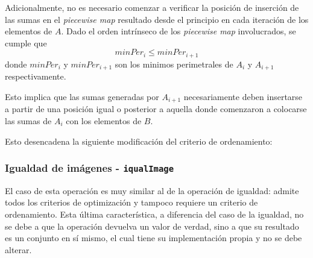 Adicionalmente, no es necesario comenzar a verificar la posición de inserción de las sumas en el \textit{piecewise map} resultado desde el principio en cada iteración de los elementos de $A$. Dado el orden intrínseco de los \textit{piecewise map} involucrados, se cumple que
\[
minPer_{i} \leq minPer_{i+1}
\]
 donde $minPer_i$ y $minPer_{i+1}$ son los minimos perimetrales de $A_i$ y $A_{i+1}$ respectivamente.
 
Esto implica que las sumas generadas por $A_{i+1}$ necesariamente deben insertarse a partir de una posición igual o posterior a aquella donde comenzaron a colocarse las sumas de $A_i$ con los elementos de $B$.

Esto desencadena la siguiente modificación del criterio de ordenamiento: 
\begin{center}
\end{center}

\subsubsection{Igualdad de imágenes - \texttt{iqualImage}}

El caso de esta operación es muy similar al de la operación de igualdad: admite todos los criterios de optimización y tampoco requiere un criterio de ordenamiento. Esta última característica, a diferencia del caso de la igualdad, no se debe a que la operación devuelva un valor de verdad, sino a que su resultado es un conjunto en sí mismo, el cual tiene su implementación propia y no se debe alterar.

